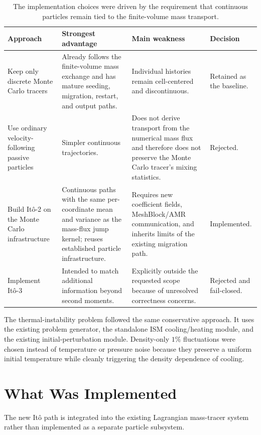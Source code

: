 \documentclass[11pt]{article}
\newcommand{\Ito}{It\^o}
\newcommand{\artifact}[1]{\path{#1}}
\begin{document}
\begin{table}[htbp]
\centering
\small
\begin{tabularx}{\textwidth}{@{}p{}X X p{}@{}}
\toprule
Approach & Strongest advantage & Main weakness & Decision \\
\midrule
Keep only discrete Monte Carlo tracers
& Already follows the finite-volume mass exchange and has mature
  seeding, migration, restart, and output paths.
& Individual histories remain cell-centered and discontinuous.
& Retained as the baseline. \\
\addlinespace
Use ordinary velocity-following passive particles
& Simpler continuous trajectories.
& Does not derive transport from the numerical mass flux and therefore
  does not preserve the Monte Carlo tracer's mixing statistics.
& Rejected. \\
\addlinespace
Build \Ito{}-2 on the Monte Carlo infrastructure
& Continuous paths with the same per-coordinate mean and variance as the
  mass-flux jump kernel; reuses established particle infrastructure.
& Requires new coefficient fields, MeshBlock/AMR communication, and
  inherits limits of the existing migration path.
& Implemented. \\
\addlinespace
Implement \Ito{}-3
& Intended to match additional information beyond second moments.
& Explicitly outside the requested scope because of unresolved correctness
  concerns.
& Rejected and fail-closed. \\
\bottomrule
\end{tabularx}
\caption{The implementation choices were driven by the requirement that
continuous particles remain tied to the finite-volume mass transport.}
\end{table}

The thermal-instability problem followed the same conservative approach. It
uses the existing \artifact{cooling_test} problem generator, the standalone
ISM cooling/heating module, and the existing initial-perturbation module.
Density-only \(1\%\) fluctuations were chosen instead of temperature or
pressure noise because they preserve a uniform initial temperature while
cleanly triggering the density dependence of cooling.

\section{What Was Implemented}

The new \Ito{} path is integrated into the existing Lagrangian mass-tracer
system rather than implemented as a separate particle subsystem.
\end{document}
